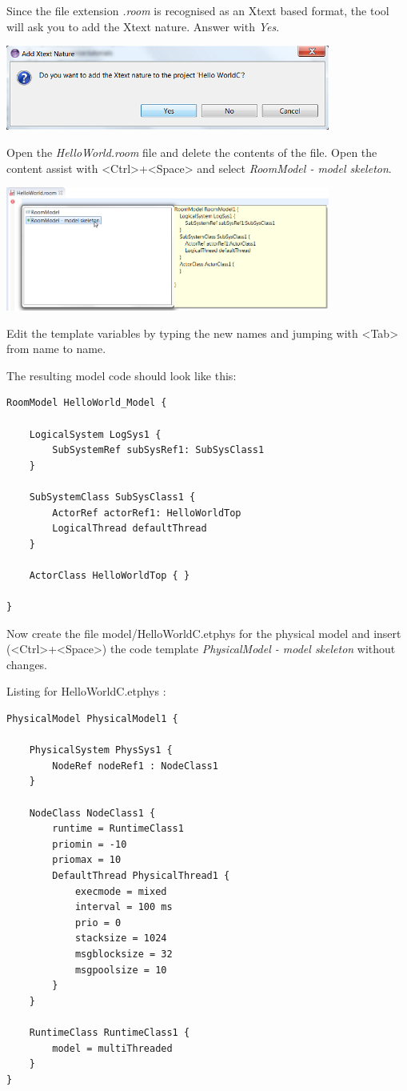 Since the file extension \textit{.room} is recognised as an Xtext based format, the tool will ask you to add the Xtext nature. Answer with \textit{Yes}. 

\includegraphics[width=0.8\textwidth]{images/016-HelloWorldC04.png}

Open the \emph{HelloWorld.room} file and delete the contents of the file. Open the content assist with <Ctrl>+<Space> and select \emph{RoomModel - model skeleton}.

\includegraphics[width=0.8\textwidth]{images/016-HelloWorldC041.png}

Edit the template variables by typing the new names and jumping with <Tab> from name to name.

The resulting model code should look like this:

\begin{lstlisting}[language=ROOM]
RoomModel HelloWorld_Model {

	LogicalSystem LogSys1 {
		SubSystemRef subSysRef1: SubSysClass1
	}

	SubSystemClass SubSysClass1 {
		ActorRef actorRef1: HelloWorldTop
		LogicalThread defaultThread
	}

	ActorClass HelloWorldTop { }

}
\end{lstlisting}

Now create the file model/HelloWorldC.etphys for the physical model and insert (<Ctrl>+<Space>) the code template \emph{PhysicalModel - model skeleton} without changes.

Listing for HelloWorldC.etphys :

\begin{lstlisting}[language=etPhys]
PhysicalModel PhysicalModel1 {

	PhysicalSystem PhysSys1 {
		NodeRef nodeRef1 : NodeClass1
	}

	NodeClass NodeClass1 {
		runtime = RuntimeClass1
		priomin = -10
		priomax = 10
		DefaultThread PhysicalThread1 {
			execmode = mixed
			interval = 100 ms
			prio = 0
			stacksize = 1024
			msgblocksize = 32
			msgpoolsize = 10
		}
	}

	RuntimeClass RuntimeClass1 {
		model = multiThreaded
	}
}
\end{lstlisting}

